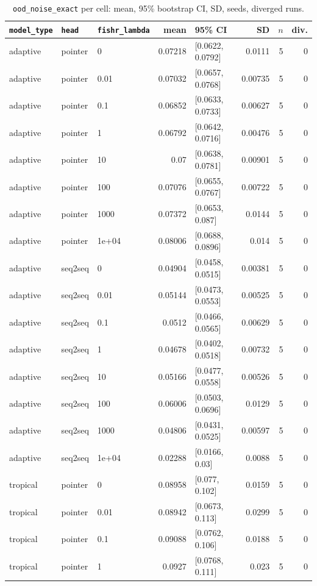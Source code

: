 \documentclass[10pt]{article}
\begin{document}
{\small
\begin{longtable}{lllrlrrr}
\caption{\texttt{ood\_noise\_exact} per cell: mean, 95\% bootstrap CI, SD, seeds, diverged runs.}\label{tab:summary-ood_noise_exact}\\
\toprule
\texttt{model\_type} & \texttt{head} & \texttt{fishr\_lambda} & mean & 95\% CI & SD & $n$ & div.\\
\midrule
\endhead
adaptive & pointer & 0 & 0.07218 & [0.0622, 0.0792] & 0.0111 & 5 & 0\\
adaptive & pointer & 0.01 & 0.07032 & [0.0657, 0.0768] & 0.00735 & 5 & 0\\
adaptive & pointer & 0.1 & 0.06852 & [0.0633, 0.0733] & 0.00627 & 5 & 0\\
adaptive & pointer & 1 & 0.06792 & [0.0642, 0.0716] & 0.00476 & 5 & 0\\
adaptive & pointer & 10 & 0.07 & [0.0638, 0.0781] & 0.00901 & 5 & 0\\
adaptive & pointer & 100 & 0.07076 & [0.0655, 0.0767] & 0.00722 & 5 & 0\\
adaptive & pointer & 1000 & 0.07372 & [0.0653, 0.087] & 0.0144 & 5 & 0\\
adaptive & pointer & 1e+04 & 0.08006 & [0.0688, 0.0896] & 0.014 & 5 & 0\\
adaptive & seq2seq & 0 & 0.04904 & [0.0458, 0.0515] & 0.00381 & 5 & 0\\
adaptive & seq2seq & 0.01 & 0.05144 & [0.0473, 0.0553] & 0.00525 & 5 & 0\\
adaptive & seq2seq & 0.1 & 0.0512 & [0.0466, 0.0565] & 0.00629 & 5 & 0\\
adaptive & seq2seq & 1 & 0.04678 & [0.0402, 0.0518] & 0.00732 & 5 & 0\\
adaptive & seq2seq & 10 & 0.05166 & [0.0477, 0.0558] & 0.00526 & 5 & 0\\
adaptive & seq2seq & 100 & 0.06006 & [0.0503, 0.0696] & 0.0129 & 5 & 0\\
adaptive & seq2seq & 1000 & 0.04806 & [0.0431, 0.0525] & 0.00597 & 5 & 0\\
adaptive & seq2seq & 1e+04 & 0.02288 & [0.0166, 0.03] & 0.0088 & 5 & 0\\
tropical & pointer & 0 & 0.08958 & [0.077, 0.102] & 0.0159 & 5 & 0\\
tropical & pointer & 0.01 & 0.08942 & [0.0673, 0.113] & 0.0299 & 5 & 0\\
tropical & pointer & 0.1 & 0.09088 & [0.0762, 0.106] & 0.0188 & 5 & 0\\
tropical & pointer & 1 & 0.0927 & [0.0768, 0.111] & 0.023 & 5 & 0\\

\end{longtable}}
\end{document}
